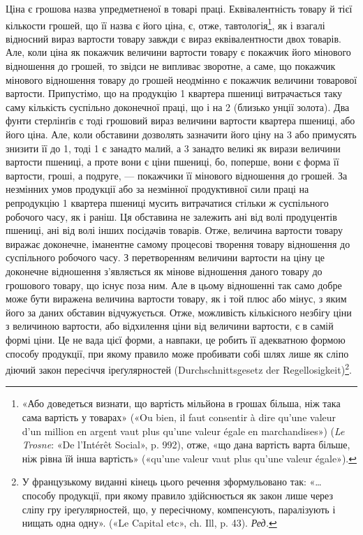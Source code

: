\disablefootnotebreak{}
Ціна є грошова назва упредметненої в товарі праці. Еквівалентність
товару й тієї кількости грошей, що її назва є його ціна, є,
отже, тавтологія\footnote{
«Або доведеться визнати, що вартість мільйона в грошах більша,
ніж така сама вартість у товарах» («Ou bien, il faut consentir à dire qu’une
valeur d’un million en argent vaut plus qu’une valeur égale en marchandises»)
(\emph{Le Trosne}: «De l’Intérêt Social», p. 992), отже, «що дана вартість варта
більше, ніж рівна їй інша вартість» («qu’une valeur vaut plus qu’une valeur
égale»).
}, як і взагалі відносний вираз вартости товару
завжди є вираз еквівалентности двох товарів. Але, коли ціна
як покажчик величини вартости товару є покажчик його мінового
відношення до грошей, то звідси не випливає зворотне,
а саме, що покажчик мінового відношення товару до грошей
неодмінно є покажчик величини товарової вартости. Припустімо,
що на продукцію 1 квартера пшениці витрачається таку саму
кількість суспільно доконечної праці, що і на 2
(близько  унції золота). Два фунти стерлінґів є тоді грошовий
вираз величини вартости квартера пшениці, або його ціна.
Але, коли обставини дозволять зазначити його ціну на 3 або примусять знизити її до 1, тоді
1 є занадто малий, а 3 занадто
великі як вирази величини вартости пшениці, а проте вони є
ціни пшениці, бо, поперше, вони є форма її вартости, гроші, а
подруге, — покажчики її мінового відношення до грошей. За
незмінних умов продукції або за незмінної продуктивної сили
праці на репродукцію 1 квартера пшениці мусить витрачатися
стільки ж суспільного робочого часу, як і раніш. Ця обставина
не залежить ані від волі продуцентів пшениці, ані від волі інших
посідачів товарів. Отже, величина вартости товару виражає доконечне,
іманентне самому процесові творення товару відношення
до суспільного робочого часу. З перетворенням величини вартости
на ціну це доконечне відношення з’являється як мінове
відношення даного товару до грошового товару, що існує поза
ним. Але в цьому відношенні так само добре може бути виражена
величина вартости товару, як і той плюс або мінус, з яким його
за даних обставин відчужується. Отже, можливість кількісного
незбігу ціни з величиною вартости, або відхилення ціни від величини
вартости, є в самій формі ціни. Це не вада цієї форми, а
навпаки, це робить її адекватною формою способу продукції,
при якому правило може пробивати собі шлях лише як сліпо
діючий закон пересіччя іреґулярностей (Durchschnittsgesetz der
Regellosigkeit)\footnote*{
У французькому виданні кінець цього речення зформульовано
так: «\dots{} способу продукції, при якому правило здійснюється як закон
лише через сліпу гру іреґулярностей, що, у пересічному, компенсують,
паралізують і нищать одна одну». («Le Capital etc», ch. Ill, p. 43). \emph{Ред.}
}.
\enablefootnotebreak{}

